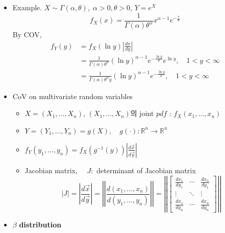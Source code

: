 \documentclass{oblivoir}
\begin{document}
\begin{itemize}
\item Example. $X \sim \Gamma(\alpha, \theta), \; \alpha > 0, \theta > 0$, $Y = e^X$
$$
f_X(x) = \frac{1}{\Gamma(\alpha) \theta^{\alpha}} x^{\alpha - 1} e^{- \frac{x}{\theta}}
$$
By COV,
\begin{align*}
f_Y(y) &= f_X(\ln y) \left| \frac{dx}{dy} \right| \\
&= \frac{1}{\Gamma(\alpha) \theta^{\alpha}} (\ln y)^{\alpha - 1} e^{- \frac{\ln y}{\theta}} e^{\ln y} , \quad 1 < y < \infty \\
&= \frac{1}{\Gamma(\alpha) \theta^{\alpha} y} (\ln y)^{\alpha - 1} e^{- \frac{\ln y}{\theta}}, \quad 1 < y < \infty
\end{align*}

\item CoV on multivariate random variables
\begin{itemize}
\item $X = (X_1, \ldots, X_n)$, $(X_1, \ldots, X_n)$의 joint $pdf$ : $f_X(x_1, \ldots, x_n)$
\item $Y = (Y_1, \ldots, Y_n) = g(X), \quad g(\cdot) : \mathbb{R}^n \rightarrow \mathbb{R}^n$
\item $f_Y(y_1, \ldots, y_n) = f_X(g^{-1}(y)) \left |\frac{d\vec{x}}{d\vec{y}} \right|$
\item Jacobian matrix, $\quad J : $ determinant of Jacobian matrix
$$
|J| = \left |\frac{d\vec{x}}{d\vec{y}} \right| = \left |\left |\frac{d(x_1, \ldots, x_n)}{d(y_1, \ldots, y_n)} \right|\right| = 
\left |\left |
\begin{bmatrix}
\frac{dx_1}{dy_1} & \cdots & \frac{dx_n}{dy_1} \\
\vdots & \ddots & \vdots \\
\frac{dx_1}{dy_n} & \cdots & \frac{dx_n}{dy_n}
\end{bmatrix}
\right|\right|
$$
\end{itemize}

\item $\beta$ \textbf{distribution}


\end{itemize}
\end{document}
